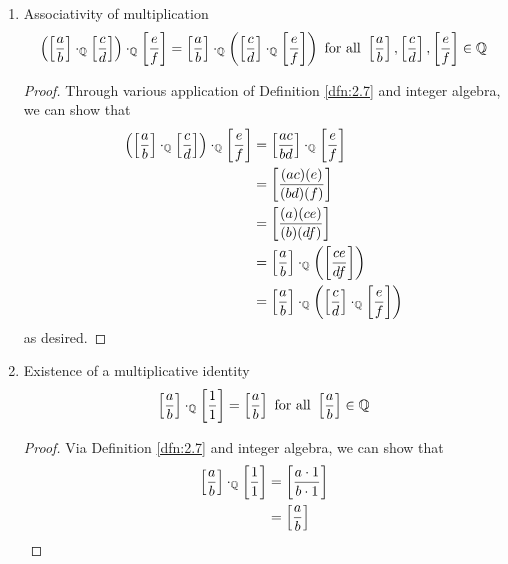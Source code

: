 \documentclass[../main.tex]{subfiles}
\begin{document}
\begin{theorem}
\begin{enumerate}[label={\alph*\textup{)}},ref={\thetheorem\alph*}]
\begin{proof}
            Via Definition \ref{dfn:2.7} and integer algebra, we can show that
            \begin{align*}
                \eqclass{a}{b}\cdotQ\eqclass{c}{d} &= \eqclass{ac}{bd}\\
                &= \eqclass{ca}{db}\\
                &= \eqclass{c}{d}\cdotQ\eqclass{a}{b}
            \end{align*}
            as desired.
        \end{proof}
        \item \label{trm:2.10f}Associativity of multiplication
        \begin{equation*}
            \left( \left[ \frac{a}{b} \right]\cdot_{\mathbb{Q}}\left[ \frac{c}{d} \right] \right)\cdot_{\mathbb{Q}}\left[ \frac{e}{f} \right] = \left[ \frac{a}{b} \right]\cdot_{\mathbb{Q}}\left( \left[ \frac{c}{d} \right]\cdot_{\mathbb{Q}}\left[ \frac{e}{f} \right] \right)\text{ for all }\left[ \frac{a}{b} \right],\left[ \frac{c}{d} \right],\left[ \frac{e}{f} \right]\in\mathbb{Q}
        \end{equation*}
        \begin{proof}
            Through various application of Definition \ref{dfn:2.7} and integer algebra, we can show that
            \begin{align*}
                \left( \left[ \frac{a}{b} \right]\cdot_{\mathbb{Q}}\left[ \frac{c}{d} \right] \right)\cdot_{\mathbb{Q}}\left[ \frac{e}{f} \right] &= \left[ \frac{ac}{bd} \right]\cdot_{\mathbb{Q}}\left[ \frac{e}{f} \right]\\
                &= \left[ \frac{(ac)(e)}{(bd)(f)} \right]\\
                &= \left[ \frac{(a)(ce)}{(b)(df)} \right]\\
                &=\left[ \frac{a}{b} \right]\cdot_{\mathbb{Q}}\left( \left[ \frac{ce}{df} \right] \right)\\
                &=\left[ \frac{a}{b} \right]\cdot_{\mathbb{Q}}\left( \left[ \frac{c}{d} \right]\cdot_{\mathbb{Q}}\left[ \frac{e}{f} \right] \right)
            \end{align*}
            as desired.
        \end{proof}
        \item \label{trm:2.10g}Existence of a multiplicative identity
        \begin{equation*}
            \left[ \frac{a}{b} \right]\cdot_{\mathbb{Q}}\left[ \frac{1}{1} \right] = \left[ \frac{a}{b} \right]\text{ for all }\left[ \frac{a}{b} \right]\in\mathbb{Q}
        \end{equation*}
        \begin{proof}
            Via Definition \ref{dfn:2.7} and integer algebra, we can show that
            \begin{align*}
                \eqclass{a}{b}\cdotQ\eqclass{1}{1} &= \eqclass{a\cdot 1}{b\cdot 1}\\
                &= \eqclass{a}{b}

\end{align*}
\end{proof}
\end{enumerate}
\end{theorem}
\end{document}

